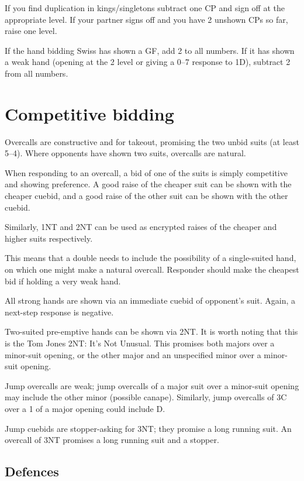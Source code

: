 \documentclass[a4paper,12pt]{article}
\begin{document}
If you find duplication in kings/singletons subtract one CP and sign off at the
appropriate level. If your partner signs off and you have 2 unshown CPs so far,
raise one level.

If the hand bidding Swiss has shown a GF, add 2 to all numbers. If it has shown
a weak hand (opening at the 2 level or giving a 0--7 response to 1D), subtract 2
from all numbers.

\section{Competitive bidding}

Overcalls are constructive and for takeout, promising the two unbid suits (at least 5--4).
Where opponents have shown two suits, overcalls are natural.

When responding to an overcall, a bid of one of the suits is simply competitive
and showing preference.  A good raise of the cheaper suit can be shown with the
cheaper cuebid, and a good raise of the other suit can be shown with the other
cuebid.  

Similarly, 1NT and 2NT can be used as encrypted raises of the cheaper and
higher suits respectively.


This means that a double needs to include the possibility of a single-suited
hand, on which one might make a natural overcall.  Responder should make the
cheapest bid if holding a very weak hand.

All strong hands are shown via an immediate cuebid of opponent's suit.  Again,
a next-step response is negative.

Two-suited pre-emptive hands can be shown via 2NT.  It is worth noting that
this is the Tom Jones 2NT: It's Not Unusual.  This promises both majors over a
minor-suit opening, or the other major and an unspecified minor over a
minor-suit opening.  

Jump overcalls are weak; jump overcalls of a major suit over a minor-suit
opening may include the other minor (possible canape).  Similarly, jump
overcalls of 3C over a 1 of a major opening could include D.

Jump cuebids are stopper-asking for 3NT; they promise a long running suit.  An
overcall of 3NT promises a long running suit and a stopper.

\subsection{Defences}
\end{document}
